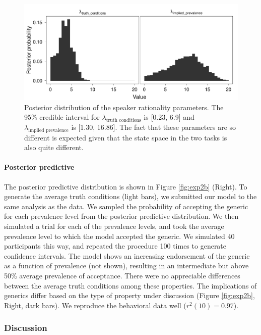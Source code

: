 \documentclass[10pt,letterpaper]{article}
\begin{document}
\begin{figure}
\centering
    \includegraphics[width=0.8\columnwidth]{asym-lambdas-2opts-phi-100k.pdf}
    \caption{Posterior distribution of the speaker rationality parameters. The 95\% credible interval for $\lambda_{\text{truth conditions}}$ is [0.23, 6.9] and  $\lambda_{\text{implied prevalence}}$ is [1.30, 16.86]. The fact that these parameters are so different is expected given that the state space in the two tasks is also quite different.}
  \label{fig:rationality2}
\end{figure}

\paragraph{Posterior predictive}

The posterior predictive distribution is shown in Figure \ref{fig:exp2b} (Right). 
To generate the average truth conditions (light bars), we submitted our model to the same analysis as the data. We sampled the probability of accepting the generic for each prevalence level from the posterior predictive distribution. We then simulated a trial for each of the prevalence levels, and took the average prevalence level to which the model accepted the generic. We simulated 40 participants this way, and repeated the procedure 100 times to generate confidence intervals. The model shows an increasing endorsement of the generic as a function of prevalence (not shown), resulting in an intermediate but above 50\% average prevalence of acceptance. There were no appreciable differences between the average truth conditions among these properties. The implications of generics differ based on the type of property under discussion (Figure \ref{fig:exp2b}, Right, dark bars). We reproduce the behavioral data well ($r^2(10) = 0.97$). 


\subsubsection{Discussion}
\end{document}
